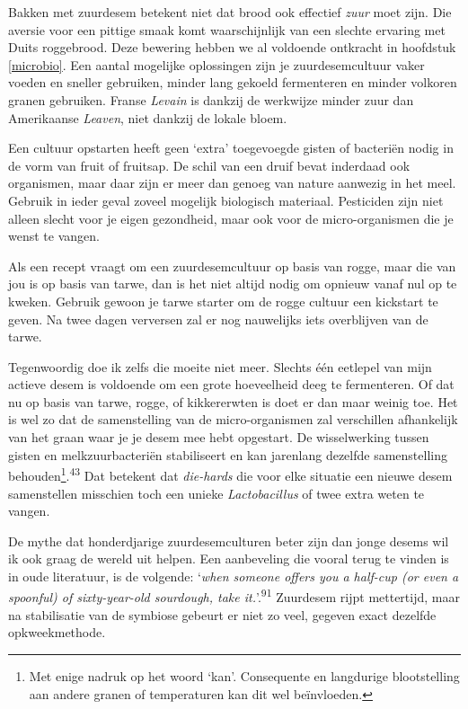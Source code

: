 \documentclass[
  11pt,
  dutch,
]{memoir}
\begin{document}
Bakken met zuurdesem betekent niet dat brood ook effectief \emph{zuur}
moet zijn. Die aversie voor een pittige smaak komt waarschijnlijk van
een slechte ervaring met Duits roggebrood. Deze bewering hebben we al
voldoende ontkracht in hoofdstuk \ref{microbio}. Een aantal mogelijke
oplossingen zijn je zuurdesemcultuur vaker voeden en sneller gebruiken,
minder lang gekoeld fermenteren en minder volkoren granen gebruiken.
Franse \emph{Levain} is dankzij de werkwijze minder zuur dan Amerikaanse
\emph{Leaven}, niet dankzij de lokale bloem.

Een cultuur opstarten heeft geen `extra' toegevoegde gisten of bacteriën
nodig in de vorm van fruit of fruitsap. De schil van een druif bevat
inderdaad ook organismen, maar daar zijn er meer dan genoeg van nature
aanwezig in het meel. Gebruik in ieder geval zoveel mogelijk biologisch
materiaal. Pesticiden zijn niet alleen slecht voor je eigen gezondheid,
maar ook voor de micro-organismen die je wenst te vangen.

\label{desemswap}

Als een recept vraagt om een zuurdesemcultuur op basis van rogge, maar
die van jou is op basis van tarwe, dan is het niet altijd nodig om
opnieuw vanaf nul op te kweken. Gebruik gewoon je tarwe starter om de
rogge cultuur een kickstart te geven. Na twee dagen verversen zal er nog
nauwelijks iets overblijven van de tarwe.

Tegenwoordig doe ik zelfs die moeite niet meer. Slechts één eetlepel van
mijn actieve desem is voldoende om een grote hoeveelheid deeg te
fermenteren. Of dat nu op basis van tarwe, rogge, of kikkererwten is
doet er dan maar weinig toe. Het is wel zo dat de samenstelling van de
micro-organismen zal verschillen afhankelijk van het graan waar je je
desem mee hebt opgestart. De wisselwerking tussen gisten en
melkzuurbacteriën stabiliseert en kan jarenlang dezelfde samenstelling
behouden\footnote{Met enige nadruk op het woord `kan'. Consequente en
  langdurige blootstelling aan andere granen of temperaturen kan dit wel
  beïnvloeden.}.\textsuperscript{43} Dat betekent dat \emph{die-hards}
die voor elke situatie een nieuwe desem samenstellen misschien toch een
unieke \emph{Lactobacillus} of twee extra weten te vangen.

De mythe dat honderdjarige zuurdesemculturen beter zijn dan jonge desems
wil ik ook graag de wereld uit helpen. Een aanbeveling die vooral terug
te vinden is in oude literatuur, is de volgende: `\emph{when someone
offers you a half-cup (or even a spoonful) of sixty-year-old sourdough,
take it.}'.\textsuperscript{91} Zuurdesem rijpt mettertijd, maar na
stabilisatie van de symbiose gebeurt er niet zo veel, gegeven exact
dezelfde opkweekmethode.
\end{document}
